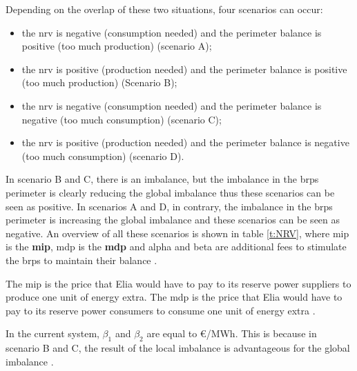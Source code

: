 Depending on the overlap of these two situations, four scenarios can occur:
\begin{itemize}
\item the \gls{nrv} is negative (consumption needed) and the perimeter balance is positive (too much production) (scenario A);
\item the \gls{nrv} is positive (production needed) and the perimeter balance is positive (too much production) (Scenario B);
\item the \gls{nrv} is negative (consumption needed) and the perimeter balance is negative (too much consumption) (scenario C);
\item the \gls{nrv} is positive (production needed) and the perimeter balance is negative (too much consumption) (scenario D).
\end{itemize}
In scenario B and C, there is an imbalance, but the imbalance in the \glspl{brp} perimeter is clearly reducing the global imbalance thus these scenarios can be seen as positive. In scenarios A and D, in contrary, the imbalance in the \glspl{brp} perimeter is increasing the global imbalance and these scenarios can be seen as negative. An overview of all these scenarios is shown in table \ref{t:NRV}, where \acrshort{mip} is the \textbf{\acrlong{mip}}, \acrshort{mdp} is the \textbf{\acrlong{mdp}} and \gls{alpha} and \gls{beta} are additional fees to stimulate the \glspl{brp} to maintain their balance \cite{EliaIT,EliaMarkt}.

The \gls{mip} is the price that Elia would have to pay to its reserve power suppliers to produce one unit of energy extra. The \gls{mdp} is the price that Elia would have to pay to its reserve power consumers to consume one unit of energy extra \cite{EliaIT}.

In the current system, $\beta_1$ and $\beta_2$ are equal to \unit[0]{\euro /MWh}. This is because in scenario B and C, the result of the local imbalance is advantageous for the global imbalance \cite{EliaIT}.

